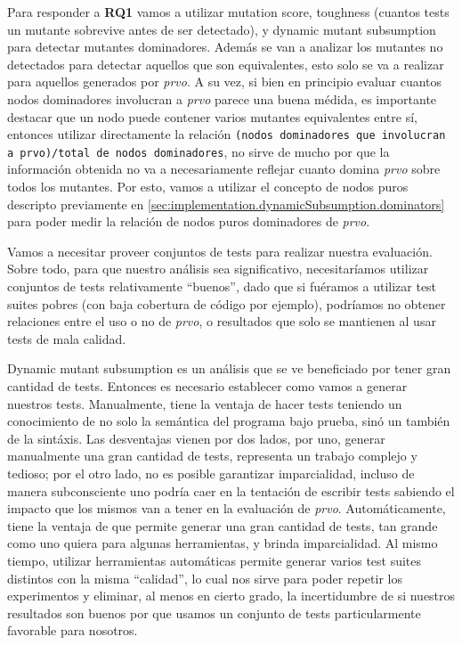 Para responder a \textbf{RQ1} vamos a utilizar mutation score, toughness (cuantos tests un mutante sobrevive antes de ser detectado), y dynamic mutant subsumption para detectar mutantes dominadores. Adem\'as se van a analizar los mutantes no detectados para detectar aquellos que son equivalentes, esto solo se va a realizar para aquellos generados por \emph{prvo}. A su vez, si bien en principio evaluar cuantos nodos dominadores involucran a \emph{prvo} parece una buena m\'edida, es importante destacar que un nodo puede contener varios mutantes equivalentes entre s\'i, entonces utilizar directamente la relaci\'on \texttt{(nodos dominadores que involucran a prvo)/total de nodos dominadores}, no sirve de mucho por que la informaci\'on obtenida no va a necesariamente reflejar cuanto domina \emph{prvo} sobre todos los mutantes. Por esto, vamos a utilizar el concepto de nodos puros descripto previamente en \ref{sec:implementation.dynamicSubsumption.dominators} para poder medir la relaci\'on de nodos puros dominadores de \emph{prvo}.

Vamos a necesitar proveer conjuntos de tests para realizar nuestra evaluaci\'on. Sobre todo, para que nuestro an\'alisis sea significativo, necesitar\'iamos utilizar conjuntos de tests relativamente ``buenos'', dado que si fu\'eramos a utilizar test suites pobres (con baja cobertura de c\'odigo por ejemplo), podr\'iamos no obtener relaciones entre el uso o no de \emph{prvo}, o resultados que solo se mantienen al usar tests de mala calidad.

Dynamic mutant subsumption es un an\'alisis que se ve beneficiado por tener gran cantidad de tests. Entonces es necesario establecer como vamos a generar nuestros tests. Manualmente, tiene la ventaja de hacer tests teniendo un conocimiento de no solo la sem\'antica del programa bajo prueba, sin\'o un tambi\'en de la sint\'axis. Las desventajas vienen por dos lados, por uno, generar manualmente una gran cantidad de tests, representa un trabajo complejo y tedioso; por el otro lado, no es posible garantizar imparcialidad, incluso de manera subconsciente uno podr\'ia caer en la tentaci\'on de escribir tests sabiendo el impacto que los mismos van a tener en la evaluaci\'on de \emph{prvo}. Autom\'aticamente, tiene la ventaja de que permite generar una gran cantidad de tests, tan grande como uno quiera para algunas herramientas, y brinda imparcialidad. Al mismo tiempo, utilizar herramientas autom\'aticas permite generar varios test suites distintos con la misma ``calidad'', lo cual nos sirve para poder repetir los experimentos y eliminar, al menos en cierto grado, la incertidumbre de si nuestros resultados son buenos por que usamos un conjunto de tests particularmente favorable para nosotros. 

